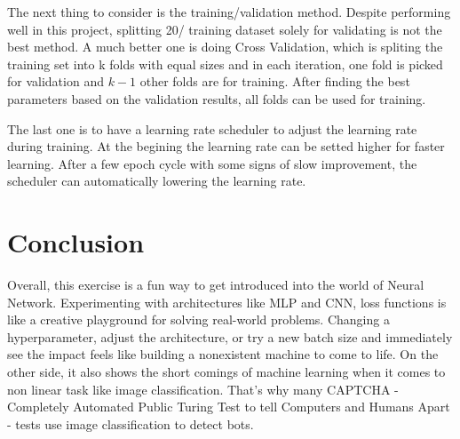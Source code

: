 \documentclass{report}
\begin{document}
The next thing to consider is the training/validation method. Despite performing well in this project, splitting 20/%
training dataset solely for validating is not the best method. A much better one is doing Cross Validation, 
which is spliting the training set into k folds with equal sizes and in each iteration, one fold is picked for
validation and $k-1$ other folds are for training. After finding the best parameters based on the validation results,
all folds can be used for training.

The last one is to have a learning rate scheduler to adjust the learning rate during training. At the begining the learning 
rate can be setted higher for faster learning. After a few epoch cycle with some signs of slow improvement, the scheduler can 
automatically lowering the learning rate.

\begingroup
\let\clearpage\relax

\chapter*{Conclusion}
Overall, this exercise is a fun way to get introduced into the world of Neural Network. Experimenting with 
architectures like MLP and CNN, loss functions is like a creative playground for solving real-world problems.
Changing a hyperparameter, adjust the architecture, or try a new batch size and immediately see the impact 
feels like building a nonexistent machine to come to life. On the other side, it also shows the short comings
of machine learning when it comes to non linear task like image classification. That's why many CAPTCHA - 
Completely Automated Public Turing Test to tell Computers and Humans Apart - tests use image classification
to detect bots.

\endgroup


\end{document}
